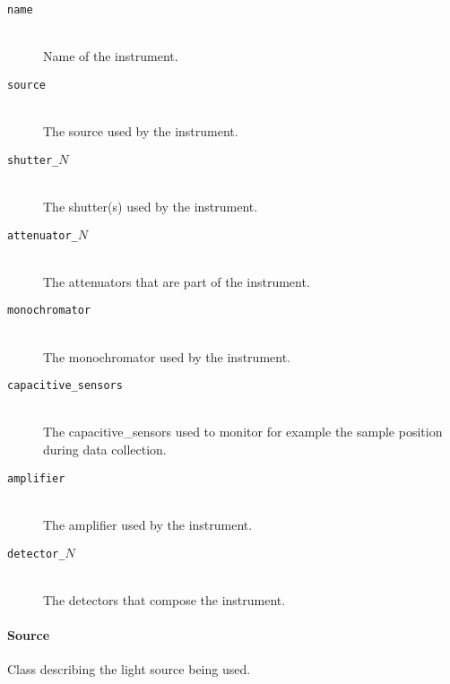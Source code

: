 \begin{description}
\item[\tt {name}] \hfill \\
{Name of the instrument.}

\item[\tt {source}] \hfill \\
{The source used by the instrument.}

\item[\tt {shutter\_$N$}] \hfill \\
{The shutter(s) used by the instrument.}

\item[\tt {attenuator\_$N$}] \hfill \\
{The attenuators that are part of the instrument.}

\item[\tt {monochromator}] \hfill \\
{The monochromator used by the instrument.}

\item[\tt {capacitive\_sensors}] \hfill \\
{The capacitive\_sensors used to monitor for example the sample position during data collection.}

\item[\tt {amplifier}] \hfill \\
{The amplifier used by the instrument.}

\item[\tt {detector\_$N$}] \hfill \\
{The detectors that compose the instrument.}
\end{description}


\paragraph{Source}
\label{table:source}

Class describing the light source being used.

